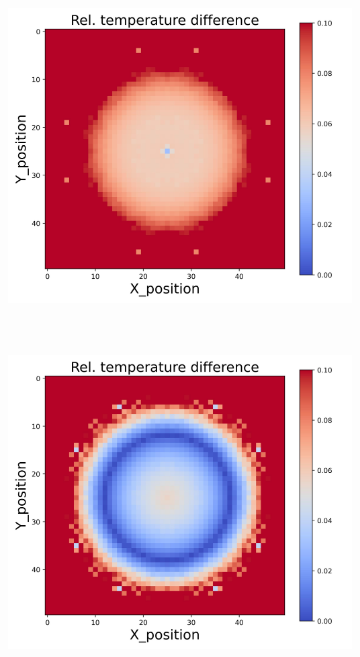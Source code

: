 \begin{figure}[h]
\begin{minipage}{\textwidth}
\begin{subfigure}{0.3\textwidth}
        \end{subfigure}
        \begin{subfigure}{0.3\textwidth}
            \centering
            \includegraphics[width=\textwidth]{figures/raw_data/21/mix/T_bias.jpg}
        \end{subfigure}
    \end{minipage}\\
    \begin{minipage}{\textwidth}
        \centering
        \begin{subfigure}{0.3\textwidth}
            \centering
            \includegraphics[width=\textwidth]{figures/raw_data/22/mix/T_bias.jpg}

\end{subfigure}
\end{minipage}
\end{figure}
